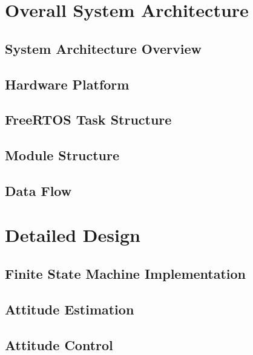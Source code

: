 \documentclass{article}
\begin{document}
    \section{Overall System Architecture}\label{sec:overall-system-architecture}

        \subsection{System Architecture Overview}\label{ssec:system-architecture}

        \subsection{Hardware Platform}\label{ssec:hardware-platform}

        \subsection{FreeRTOS Task Structure}\label{ssec:freertos-task-structure}

        \subsection{Module Structure}\label{ssec:module-structure}

        \subsection{Data Flow}\label{ssec:data-flow}

    \section{Detailed Design}\label{sec:detailed-design}

        \subsection{Finite State Machine Implementation}\label{ssec:fsm}

        \subsection{Attitude Estimation}\label{ssec:attitude-estimation}

        \subsection{Attitude Control}\label{ssec:attitude-control}
\end{document}
